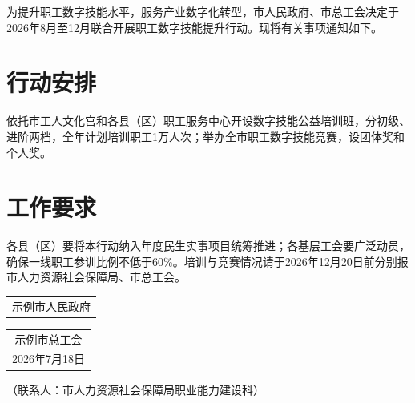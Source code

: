 \documentclass[linespread=1.81, twoside]{ctexart}
\begin{document}
为提升职工数字技能水平，服务产业数字化转型，市人民政府、市总工会决定于
2026年8月至12月联合开展职工数字技能提升行动。现将有关事项通知如下。

\section{行动安排}

依托市工人文化宫和各县（区）职工服务中心开设数字技能公益培训班，分初级、
进阶两档，全年计划培训职工1万人次；举办全市职工数字技能竞赛，设团体奖和
个人奖。

\section{工作要求}

各县（区）要将本行动纳入年度民生实事项目统筹推进；各基层工会要广泛动员，
确保一线职工参训比例不低于60\%。培训与竞赛情况请于2026年12月20日前分别报
市人力资源社会保障局、市总工会。

\par\nointerlineskip
\vspace{\baselineskip}
\noindent\hfill
\begin{tabular}[t]{@{}c@{}}
  示例市人民政府
\end{tabular}\hspace{4\ccwd}%
\begin{tabular}[t]{@{}c@{}}
  示例市总工会\\
  2026年7月18日
\end{tabular}\hspace*{4\ccwd}\par
\noindent\hspace{2\ccwd}（联系人：市人力资源社会保障局职业能力建设科）\par
\end{document}
